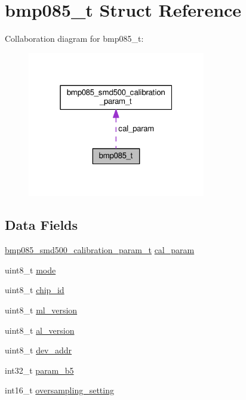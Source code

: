 \hypertarget{structbmp085__t}{\section{bmp085\+\_\+t Struct Reference}
\label{structbmp085__t}
}


Collaboration diagram for bmp085\+\_\+t\+:\nopagebreak
\begin{figure}[H]
\begin{center}
\leavevmode
\includegraphics[width=220pt]{structbmp085__t__coll__graph}
\end{center}
\end{figure}
\subsection*{Data Fields}
\begin{DoxyCompactItemize}
\item 
\hyperlink{structbmp085__smd500__calibration__param__t}{bmp085\+\_\+smd500\+\_\+calibration\+\_\+param\+\_\+t} \hyperlink{structbmp085__t_a3a31b912ea8b55c74a3be97c0933f830}{cal\+\_\+param}
\item 
uint8\+\_\+t \hyperlink{structbmp085__t_a4732a903725387a70214f44df99cce18}{mode}
\item 
uint8\+\_\+t \hyperlink{structbmp085__t_aedb1257a84b637a38aa9a91aab72a7bd}{chip\+\_\+id}
\item 
uint8\+\_\+t \hyperlink{structbmp085__t_a43121f17ce25be1edafe80cc86f57834}{ml\+\_\+version}
\item 
uint8\+\_\+t \hyperlink{structbmp085__t_a4f2ef0c63be88159461ce3d134569fbc}{al\+\_\+version}
\item 
uint8\+\_\+t \hyperlink{structbmp085__t_aeff28f1e5996c00145e51ab2b7d2830f}{dev\+\_\+addr}
\item 
int32\+\_\+t \hyperlink{structbmp085__t_a52efc2a28cab750a500e80bd812236e6}{param\+\_\+b5}
\item 
int16\+\_\+t \hyperlink{structbmp085__t_a9af6d243028d82c2249e774ad240f125}{oversampling\+\_\+setting}
\end{DoxyCompactItemize}


